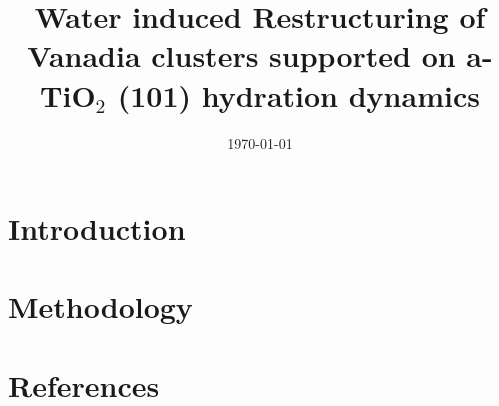 \documentclass[aip,amsmath,amssymb,reprint, jcp]{revtex4-1}
\begin{document}
\title[]{Water induced Restructuring of Vanadia clusters supported on a-TiO$_2$ (101) hydration dynamics}
 
\date{\today}%

\begin{abstract}

\end{abstract}
\maketitle

\section{\label{sec:introduction}Introduction}


\section{Methodology}

\section{References}

\end{document}
